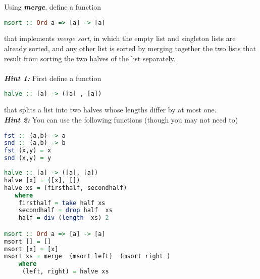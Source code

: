 \documentclass{article}
\begin{document}
\begin{Exercise}[difficulty = 4]
Using \textbf{\textit{merge}}, define a function 
\begin{lstlisting}[language=Haskell]
msort :: Ord a => [a] -> [a] 
\end{lstlisting}
that implements \textit{merge sort}, in which the empty list and singleton lists are already sorted, and any other list is sorted by merging together the two lists that result from sorting the two halves of the list separately.\\ \\
\textbf{\textit{Hint 1:}} First define a function 
\begin{lstlisting}[language=Haskell]
halve :: [a] -> ([a] , [a])
\end{lstlisting}
that splits a list into two halves whose lengths differ by at most one. \\
\textbf{\textit{Hint 2:}} You can use the following functions (though you may not need to) 
\begin{lstlisting}[language=Haskell]
fst :: (a,b) -> a
snd :: (a,b) -> b
fst (x,y) = x
snd (x,y) = y
\end{lstlisting}
\end{Exercise}
\begin{Answer}
\begin{lstlisting}[language=Haskell]
halve :: [a] -> ([a], [a]) 
halve [x] = ([x], [])
halve xs = (firsthalf, secondhalf)
   where 
    firsthalf = take half xs
    secondhalf = drop half  xs
    half = div (length  xs) 2

msort :: Ord a => [a] -> [a]    
msort [] = [] 
msort [x] = [x]
msort xs = merge  (msort left)  (msort right )
    where 
     (left, right) = halve xs
\end{lstlisting}
\end{Answer}

\end{document}
